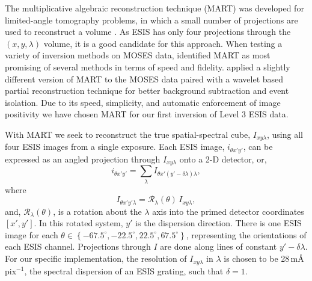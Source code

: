 The multiplicative algebraic reconstruction technique (MART) was developed for limited-angle tomography problems, in which a small number of projections are used to reconstruct a volume \citep{Okamoto1991,Verhoeven1993}. 
As ESIS has only four projections through the $(x,y,\lambda)$ volume, it is a good candidate for this approach.
When testing a variety of inversion methods on MOSES data, \citet{Fox2011} identified MART as most promising of several methods in terms of speed and fidelity.
\citet{Rust2017} applied a slightly different version of MART to the MOSES data paired with a wavelet based partial reconstruction technique for better background subtraction and event isolation.
Due to its speed, simplicity, and automatic enforcement of image positivity we have chosen MART for our first inversion of Level 3 ESIS data.


With MART we seek to reconstruct the true spatial-spectral cube, $I_{xy\lambda}$, using all four ESIS images from a single exposure.
Each ESIS image, $i_{\theta x'y'}$, can be expressed as an angled projection through $I_{xy\lambda}$ onto a 2-D detector, or,
\begin{equation}
i_{\theta x'y'} = \sum_\lambda I_{\theta x'(y'-\delta\lambda)\lambda},
\end{equation}
where
\begin{equation}
I_{\theta x'y'\lambda} = \mathcal{R}_\lambda(\theta)\,I_{xy\lambda},
\end{equation} 
and, $\mathcal{R}_\lambda (\theta)$, is a rotation about the $\lambda$ axis into the primed detector coordinates $[x',y']$. 
In this rotated system, $y'$ is the dispersion direction.
There is one ESIS image for each $\theta \in \left\{ -67.5^{\circ}, -22.5^{\circ}, 22.5^{\circ},67.5^{\circ} \right\}$, representing the  orientations of each ESIS channel.
Projections through $I$ are done along lines of constant $y'-\delta\lambda$.
For our specific implementation, the resolution of $I_{xy\lambda}$ in $\lambda$ is chosen to be 28\,m\AA\,pix$^{-1}$, the spectral dispersion of an ESIS grating, such that $\delta = 1$. 

